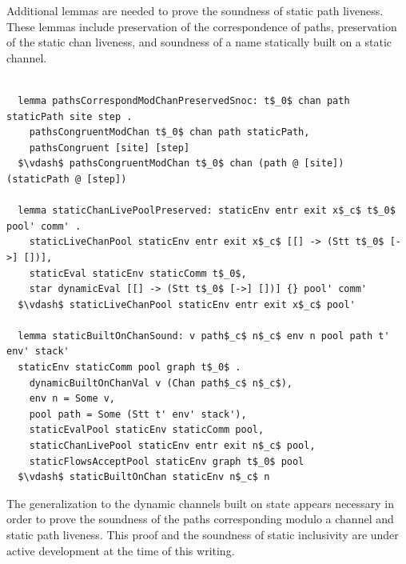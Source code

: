 \documentclass[letterpaper, 11pt]{extarticle}
\begin{document}
Additional lemmas are needed to prove the soundness of static path liveness.  These lemmas include
preservation of the correspondence of paths, preservation of the static chan liveness, and soundness of
a name statically built on a static channel.


\begin{lstlisting}[language=logic, mathescape]

  lemma pathsCorrespondModChanPreservedSnoc: t$_0$ chan path staticPath site step .
    pathsCongruentModChan t$_0$ chan path staticPath,
    pathsCongruent [site] [step]
  $\vdash$ pathsCongruentModChan t$_0$ chan (path @ [site]) (staticPath @ [step])

  lemma staticChanLivePoolPreserved: staticEnv entr exit x$_c$ t$_0$ pool' comm' . 
    staticLiveChanPool staticEnv entr exit x$_c$ [[] -> (Stt t$_0$ [->] [])],
    staticEval staticEnv staticComm t$_0$,
    star dynamicEval [[] -> (Stt t$_0$ [->] [])] {} pool' comm'
  $\vdash$ staticLiveChanPool staticEnv entr exit x$_c$ pool'

  lemma staticBuiltOnChanSound: v path$_c$ n$_c$ env n pool path t' env' stack'
  staticEnv staticComm pool graph t$_0$ . 
    dynamicBuiltOnChanVal v (Chan path$_c$ n$_c$),
    env n = Some v,
    pool path = Some (Stt t' env' stack'),
    staticEvalPool staticEnv staticComm pool,
    staticChanLivePool staticEnv entr exit n$_c$ pool,
    staticFlowsAcceptPool staticEnv graph t$_0$ pool
  $\vdash$ staticBuiltOnChan staticEnv n$_c$ n

\end{lstlisting}


The generalization to the dynamic channels built on state appears necessary in order to prove the soundness of
the paths corresponding modulo a channel and static path liveness.
This proof and the soundness of static inclusivity are under active development at the time of this writing.
\end{document}
